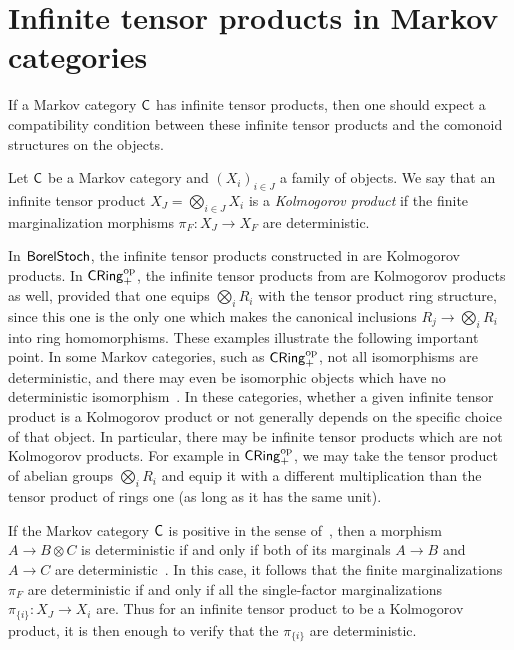 \documentclass[11pt]{article}
\begin{document}
\section{Infinite tensor products in Markov categories}
\label{infprod_markov}

If a Markov category $\mathsf{C}$ has infinite tensor products, then one should expect a compatibility condition between these infinite tensor products and the comonoid structures on the objects. %

\begin{definition}
    \label{defn_kolmogorov_ext}
    Let $\mathsf{C}$ be a Markov category and $(X_i)_{i \in J}$ a family of objects. We say that an infinite tensor product $X_J = \bigotimes_{i \in J} X_i$ is a \emph{Kolmogorov product} if the finite marginalization morphisms $\pi_F : X_J \to X_F$ are deterministic.
\end{definition}

In $\operatorname{\mathsf{BorelStoch}}$, the infinite tensor products constructed in  are Kolmogorov products. In $\operatorname{\mathsf{CRing}}_+^{\mathrm{op}}$, the infinite tensor products from  are Kolmogorov products as well, provided that one equips $\bigotimes_i R_i$ with the tensor product ring structure, since this one is the only one which makes the canonical inclusions $R_j \to \bigotimes_i R_i$ into ring homomorphisms. These examples illustrate the following important point. In some Markov categories, such as $\operatorname{\mathsf{CRing}}_+^{\mathrm{op}}$, not all isomorphisms are deterministic, and there may even be isomorphic objects which have no deterministic isomorphism~\cite[Remark~10.9]{markov_cats}. In these categories, whether a given infinite tensor product is a Kolmogorov product or not generally depends on the specific choice of that object. In particular, there may be infinite tensor products which are not Kolmogorov products. For example in $\operatorname{\mathsf{CRing}}_+^{\mathrm{op}}$, we may take the tensor product of abelian groups $\bigotimes_i R_i$ and equip it with a different multiplication than the tensor product of rings one (as long as it has the same unit).

\begin{remark}
	If the Markov category $\mathsf{C}$ is positive in the sense of~\cite[Definition~11.22]{markov_cats}, then a morphism $A \to B \otimes C$ is deterministic if and only if both of its marginals $A \to B$ and $A \to C$ are deterministic~\cite[Corollary~12.15]{markov_cats}. In this case, it follows that the finite marginalizations $\pi_F$ are deterministic if and only if all the single-factor marginalizations $\pi_{\{i\}} : X_J \to X_i$ are. Thus for an infinite tensor product to be a Kolmogorov product, it is then enough to verify that the $\pi_{\{i\}}$ are deterministic.
\end{remark}
\end{document}
